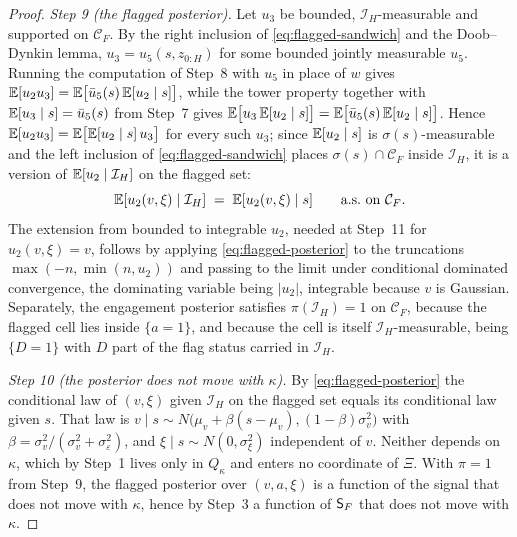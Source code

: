 \begin{proof}
\emph{Step 9 (the flagged posterior).} Let $u_3$ be bounded, $\mathcal I_H$-measurable and supported
on $\mathcal C_F$. By the right inclusion of \eqref{eq:flagged-sandwich} and the Doob--Dynkin lemma,
$u_3=u_5(s,z_{0:H})$ for some bounded jointly measurable $u_5$. Running the computation of Step~8
with $u_5$ in place of $w$ gives $\mathbb{E}[u_2u_3]=\mathbb{E}\bigl[\bar u_5(s)\,\mathbb{E}[u_2\mid s]\bigr]$, while
the tower property together with $\mathbb{E}[u_3\mid s]=\bar u_5(s)$ from Step~7 gives
$\mathbb{E}\bigl[u_3\,\mathbb{E}[u_2\mid s]\bigr]=\mathbb{E}\bigl[\bar u_5(s)\,\mathbb{E}[u_2\mid s]\bigr]$. Hence
$\mathbb{E}[u_2u_3]=\mathbb{E}\bigl[\mathbb{E}[u_2\mid s]\,u_3\bigr]$ for every such $u_3$; since $\mathbb{E}[u_2\mid s]$ is
$\sigma(s)$-measurable and the left inclusion of \eqref{eq:flagged-sandwich} places
$\sigma(s)\cap\mathcal C_F$ inside $\mathcal I_H$, it is a version of $\mathbb{E}[u_2\mid\mathcal I_H]$ on
the flagged set:
\begin{equation}
\label{eq:flagged-posterior}
\mathbb{E}[u_2(v,\xi) \mid \mathcal I_H] \;=\; \mathbb{E}[u_2(v,\xi) \mid s]
 \qquad \text{a.s.\ on } \mathcal C_F .
\end{equation}
The extension from bounded to integrable $u_2$, needed at Step~11 for $u_2(v,\xi)=v$, follows by
applying \eqref{eq:flagged-posterior} to the truncations $\max(-n,\min(n,u_2))$ and passing to the
limit under conditional dominated convergence, the dominating variable being $|u_2|$, integrable
because $v$ is Gaussian. Separately, the engagement posterior satisfies $\pi(\mathcal I_H)=1$ on
$\mathcal C_F$, because the flagged cell lies inside $\{a=1\}$, and because the cell is itself
$\mathcal I_H$-measurable, being $\{D=1\}$ with $D$ part of the flag status carried in
$\mathcal I_H$.

\emph{Step 10 (the posterior does not move with $\kappa$).} By \eqref{eq:flagged-posterior} the
conditional law of $(v,\xi)$ given $\mathcal I_H$ on the flagged set equals its conditional law given
$s$. That law is $v\mid s \sim N\bigl(\mu_v+\beta(s-\mu_v),(1-\beta)\sigma_v^2\bigr)$ with
$\beta=\sigma_v^2/(\sigma_v^2+\sigma_\varepsilon^2)$, and $\xi\mid s \sim N(0,\sigma_\xi^2)$
independent of $v$. Neither depends on $\kappa$, which by Step~1 lives only in $Q_\kappa$ and enters
no coordinate of $\Xi$. With $\pi=1$ from Step~9, the flagged posterior over $(v,a,\xi)$ is a
function of the signal that does not move with $\kappa$, hence by Step~3 a function of $\mathsf{S}_F$ that
does not move with $\kappa$.


\end{proof}
